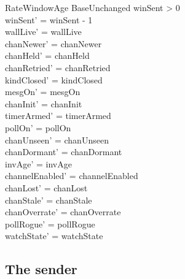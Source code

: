 \documentclass[a4paper,10pt,fleqn]{article}
\begin{document}
\begin{schema}{RateWindowAge}
  BaseUnchanged
  \where
  winSent > 0 \\
  winSent' = winSent - 1 \\
  wallLive' = wallLive \\
  chanNewer' = chanNewer \\
  chanHeld' = chanHeld \\
  chanRetried' = chanRetried \\
  kindClosed' = kindClosed \\
  mesgOn' = mesgOn \\
  chanInit' = chanInit \\
  timerArmed' = timerArmed \\
  pollOn' = pollOn \\
  chanUnseen' = chanUnseen \\
  chanDormant' = chanDormant \\
  invAge' = invAge \\
  channelEnabled' = channelEnabled \\
  chanLost' = chanLost \\
  chanStale' = chanStale \\
  chanOverrate' = chanOverrate \\
  pollRogue' = pollRogue \\
  watchState' = watchState
\end{schema}

\subsection{The sender}
\label{sec:chansender}
\end{document}
